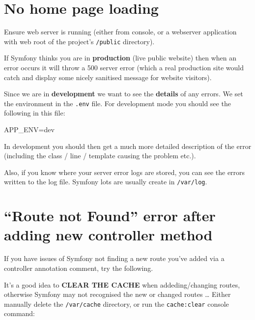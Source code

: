 \documentclass[a4paperpaper,openright]{book}
\newenvironment{Shaded}{}{}
\newcommand{\ExtensionTok}[1]{#1}
\newcommand{\NormalTok}[1]{#1}
\newcommand{\StringTok}[1]{\textcolor[rgb]{0.25,0.44,0.63}{#1}}
\newcommand{\VariableTok}[1]{\textcolor[rgb]{0.10,0.09,0.49}{#1}}
\begin{document}
\hypertarget{no-home-page-loading}{%
\section{No home page loading}\label{no-home-page-loading}}

Ensure web server is running (either from console, or a webserver
application with web root of the project's \texttt{/public} directory).

If Symfony thinks you are in \textbf{production} (live public website)
then when an error occurs it will throw a 500 server error (which a real
production site would catch and display some nicely sanitised message
for website visitors).

Since we are in \textbf{development} we want to see the \textbf{details}
of any errors. We set the environment in the \texttt{.env} file. For
development mode you should see the following in this file:

\begin{Shaded}
\begin{Highlighting}[]
    \VariableTok{APP_ENV=}\NormalTok{dev}
\end{Highlighting}
\end{Shaded}

In development you should then get a much more detailed description of
the error (including the class / line / template causing the problem
etc.).

Also, if you know where your server error logs are stored, you can see
the errors written to the log file. Symfony lots are usually create in
\texttt{/var/log}.

\hypertarget{route-not-found-error-after-adding-new-controller-method}{%
\section{``Route not Found'' error after adding new controller
method}\label{route-not-found-error-after-adding-new-controller-method}}

If you have issues of Symfony not finding a new route you've added via a
controller annotation comment, try the following.

It's a good idea to \textbf{CLEAR THE CACHE} when addeding/changing
routes, otherwise Symfony may not recognised the new or changed routes
\ldots{} Either manually delete the \texttt{/var/cache} directory, or
run the \texttt{cache:clear} console command:

\begin{Shaded}
\end{Shaded}
\end{document}
